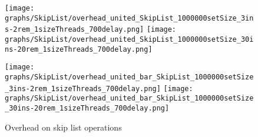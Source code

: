 \documentclass{article}
\begin{document}
\begin{figure*}[htbp]
    \texttt{[image: graphs/SkipList/overhead\_united\_SkipList\_1000000setSize\_3ins-2rem\_1sizeThreads\_700delay.png]}\hspace{2.5em}
    \texttt{[image: graphs/SkipList/overhead\_united\_SkipList\_1000000setSize\_30ins-20rem\_1sizeThreads\_700delay.png]}\par
    \texttt{[image: graphs/SkipList/overhead\_united\_bar\_SkipList\_1000000setSize\_3ins-2rem\_1sizeThreads\_700delay.png]}\hspace{2.5em}
    \texttt{[image: graphs/SkipList/overhead\_united\_bar\_SkipList\_1000000setSize\_30ins-20rem\_1sizeThreads\_700delay.png]}\par
    \caption{Overhead on skip list operations}
    \label{fig:SkipList overhead}
\end{figure*}
\end{document}
